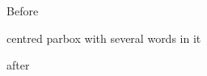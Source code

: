 \documentclass[12pt]{article}
\begin{document}
Before \parbox{3cm}{centred parbox with several words in it} after
\end{document}
